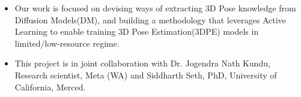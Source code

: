 \documentclass[10pt,a4paper,ragged2e]{altacv}
\begin{document}
\begin{itemize}
    \item Our work is focused on devising ways of extracting 3D Pose knowledge from Diffusion Models(DM), and building a methodology that leverages Active Learning to enable training 3D Pose Estimation(3DPE) models in limited/low-resource regime.
    \item This project is in joint collaboration with Dr. Jogendra Nath Kundu, Research scientist, Meta (WA) and Siddharth Seth, PhD, University of California, Merced.
\end{itemize}


\end{document}

